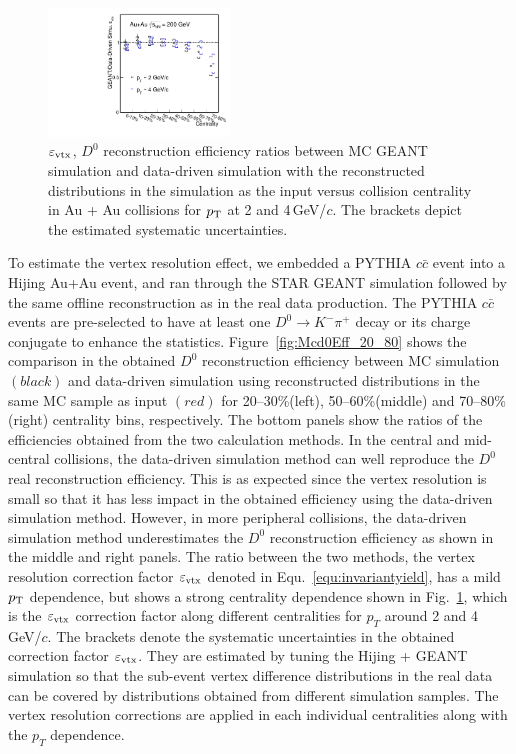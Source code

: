 \documentclass[%
 reprint,	
 amsmath,amssymb,
 aps,
 prc,
]{revtex4-1}
\begin{document}
\begin{figure}
\centering
\includegraphics[width=0.43\textwidth]{fig/Mcd0Eff_20_80_vsCent.pdf}
\caption{$\varepsilon_{\rm vtx}$, $D^0$ reconstruction efficiency ratios between MC GEANT simulation and data-driven simulation with the reconstructed distributions in the simulation as the input versus collision centrality in Au + Au collisions for $p_{\rm T}$ at 2 and 4\,GeV/$c$. The brackets depict the estimated systematic uncertainties.}
\label{fig:Mcd0Eff_20_80_vsCent} 
\end{figure}

To estimate the vertex resolution effect, we embedded a PYTHIA $c\bar{c}$ event into a Hijing Au+Au event, and ran through the STAR GEANT simulation followed by the same offline reconstruction as in the real data production. The PYTHIA $c\bar{c}$ events are pre-selected to have at least one $D^0\rightarrow K^-\pi^+$ decay or its charge conjugate to enhance the statistics. Figure~\ref{fig:Mcd0Eff_20_80} shows the comparison in the obtained $D^0$ reconstruction efficiency between MC simulation $(black)$ and data-driven simulation using reconstructed distributions in the same MC sample as input $(red)$ for 20--30\%(left), 50--60\%(middle) and 70--80\%(right) centrality bins, respectively. The bottom panels show the ratios of the efficiencies obtained from the two calculation methods. In the central and mid-central collisions, the data-driven simulation method can well reproduce the $D^0$ real reconstruction efficiency. This is as expected since the vertex resolution is small so that it has less impact in the obtained efficiency using the data-driven simulation method. However, in more peripheral collisions, the data-driven simulation method underestimates the $D^0$ reconstruction efficiency as shown in the middle and right panels. The ratio between the two methods, the vertex resolution correction factor $\varepsilon_{\rm vtx}$ denoted in Equ.~\ref{equ:invariantyield}, has a mild $p_{\rm T}$ dependence, but shows a strong centrality dependence shown in Fig.~\ref{fig:Mcd0Eff_20_80_vsCent}, which is the $\varepsilon_{\rm vtx}$ correction factor along different centralities for $p_T$ around 2 and 4 GeV/$c$. The brackets denote the systematic uncertainties in the obtained correction factor $\varepsilon_{\rm vtx}$. They are estimated by tuning the Hijing + GEANT simulation so that the sub-event vertex difference distributions in the real data can be covered by distributions obtained from different simulation samples. The vertex resolution corrections are applied in each individual centralities along with the $p_T$ dependence.
\end{document}
